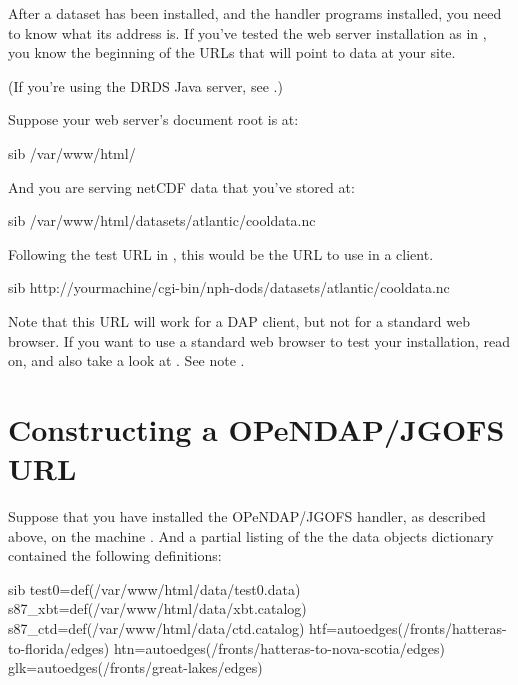\documentclass{dods-book}
\begin{document}
After a dataset has been installed, and the handler programs installed,
you need to know what its address is.  If you've tested the web server
installation as in , you know the
beginning of the URLs that will point to data at your site.

(If you're using the DRDS Java server, see .)

Suppose your web server's document root is at:

\begin{vcode}{sib}
/var/www/html/
\end{vcode}

And you are serving netCDF data that you've stored at:

\begin{vcode}{sib}
/var/www/html/datasets/atlantic/cooldata.nc
\end{vcode}

Following the test URL in , this would
be the URL to use in a client.

\begin{vcode}{sib}
http://yourmachine/cgi-bin/nph-dods/datasets/atlantic/cooldata.nc
\end{vcode}

Note that this URL will work for a DAP client, but not for a standard
web browser. If you want to use a standard web browser to test your
installation, read on, and also take a look at \DODSquick . See note
.


\section{Constructing a OPeNDAP/JGOFS URL}

Suppose that you have installed the OPeNDAP/JGOFS handler, as described
above, on the machine .  And a partial listing
of the the data objects dictionary contained the following
definitions:

\begin{vcode}{sib} 
test0=def(/var/www/html/data/test0.data)
s87_xbt=def(/var/www/html/data/xbt.catalog)
s87_ctd=def(/var/www/html/data/ctd.catalog)
htf=autoedges(/fronts/hatteras-to-florida/edges)
htn=autoedges(/fronts/hatteras-to-nova-scotia/edges)
glk=autoedges(/fronts/great-lakes/edges)
\end{vcode}
\end{document}
